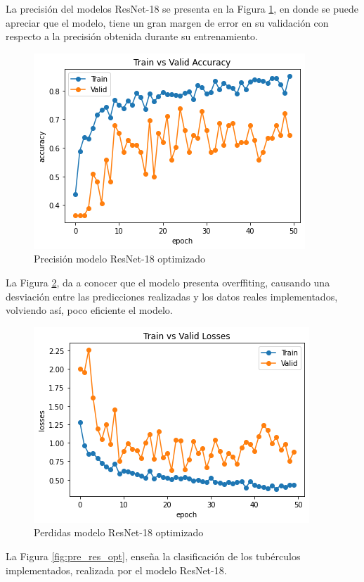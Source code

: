 La precisión del modelos ResNet-18 se presenta en la Figura \ref{fig:preci_RES_OPT}, en donde se puede apreciar que el modelo, tiene un gran margen de error en su validación con respecto a la precisión obtenida durante su entrenamiento.

\begin{figure}[ht]
	\centering
	\includegraphics[scale=0.6]{Figs/512.png}
	\caption{Precisión modelo ResNet-18 optimizado}
	\label{fig:preci_RES_OPT}
\end{figure}

La Figura \ref{fig:perdda_REs_opt}, da a conocer que el modelo presenta overffiting, causando una desviación entre las predicciones realizadas y los datos reales implementados, volviendo así, poco eficiente el modelo.	

\begin{figure}[ht]
	\centering
	\includegraphics[scale=0.6]{Figs/513.png}
	\caption{Perdidas modelo ResNet-18 optimizado}
	\label{fig:perdda_REs_opt}
\end{figure}

\newpage
La Figura \ref{fig:pre_res_opt}, enseña la clasificación de los tubérculos implementados, realizada por el modelo ResNet-18.

